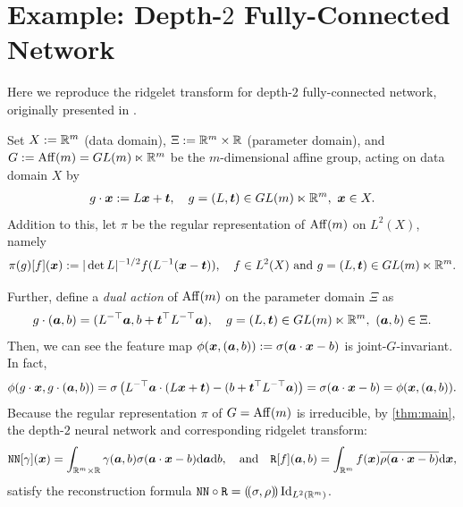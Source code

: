 \section{Example: Depth-$2$ Fully-Connected Network} \label{sec:depth2}
Here we reproduce the ridgelet transform for depth-$2$ fully-connected network, originally presented in \citet{sonoda2023joint}.



Set $X := \mathbb{R}^m$ (data domain), $\Xi := \mathbb{R}^m\times\mathbb{R}$ (parameter domain),
and $G := \operatorname{Aff}(m) = GL(m) \ltimes \mathbb{R}^m$ be the $m$-dimensional affine group, acting on data domain $X$ by
\begin{align*}
g \cdot \bm{x} := L\bm{x} + \bm{t}, \quad g = (L,\bm{t}) \in GL(m) \ltimes \mathbb{R}^m, \ \bm{x} \in X.
\end{align*}
Addition to this, let $\pi$ be the regular representation of $\operatorname{Aff}(m)$ on $L^2(X)$, namely
\begin{align*}
    \pi(g)[f](\bm{x}) := |\det L|^{-1/2} f(L^{-1}(\bm{x}-\bm{t})), \quad f \in L^2(X) \mbox{ and } g = (L,\bm{t}) \in GL(m) \ltimes \mathbb{R}^m.
\end{align*}

Further, define a \emph{dual action} of $\operatorname{Aff}(m)$ on the parameter domain $\Xi$ as 
	\begin{align*}
		g \cdot (\aa,b) = (L^{-\top}\aa, b + \tt^\top L^{-\top}\aa), \quad g = (L,\tt) \in GL(m) \ltimes \RR^m, \ (\aa,b) \in \Xi. %
	\end{align*}
	Then, we can see the feature map $\phi(\bm{x},(\bm{a},b)) := \sigma( \bm{a}\cdot\bm{x}-b )$ is joint-$G$-invariant. In fact,
	\begin{align*}
		\phi( g \cdot \bm{x}, g \cdot (\bm{a},b) )
		= \sigma\left( L^{-\top} \bm{a} \cdot (L\bm{x}+\bm{t}) - (b + \bm{t}^\top L^{-\top} \bm{a})\right) = \sigma(\bm{a}\cdot\bm{x}-b)
		= \phi( \bm{x}, (\bm{a},b) ).
	\end{align*}
	Because the regular representation $\pi$ of $G = \operatorname{Aff}(m)$ is irreducible, by \cref{thm:main}, the depth-$2$ neural network and corresponding ridgelet transform:
	\begin{align*}
		\mathtt{NN}[\gamma](\bm{x}) = \int_{\mathbb{R}^m\times\mathbb{R}} \gamma(\bm{a},b) \sigma(\bm{a}\cdot\bm{x}-b)\mathrm{d}\bm{a}\mathrm{d} b,
		\quad \mbox{and} \quad 
		\mathtt{R}[f](\bm{a},b) = \int_{\mathbb{R}^m} f(\bm{x}) \overline{\rho(\bm{a}\cdot\bm{x}-b)}\mathrm{d}\bm{x},
	\end{align*}
	satisfy the reconstruction formula $\mathtt{NN} \circ \mathtt{R} = (\!(\sigma,\rho)\!) \operatorname{Id}_{L^2(\mathbb{R}^m)}$.
